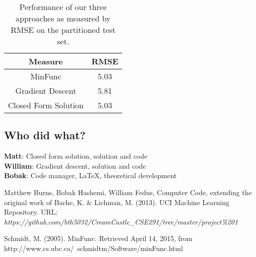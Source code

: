 \documentclass[12pt,oneside]{article}
\begin{document}
\begin{flushleft}
\begin{table}[h!]
\centering
 \begin{tabular}{| c | c|} 
 \hline
   Measure & RMSE\\ [0.7ex] 
 \hline\hline
  MinFunc & 5.03  \\ 
  \hline
  Gradient Descent & 5.81  \\  [1ex] 
 \hline
  Closed Form Solution & 5.03  \\  [1ex] 
 \hline
 \end{tabular}
 \caption{Performance of our three approaches as measured by RMSE on the partitioned test set.}
\label{tab:performance}
\end{table}

\pagebreak 


\subsection*{Who did what?}
\textbf{Matt}: Closed form solution, solution and code\\
\textbf{William}: Gradient descent, solution and code\\
\textbf{Bobak}: Code manager, LaTeX, theoretical development\\




\begin{thebibliography}{9}

  Matthew Burns, Bobak Hashemi, William Fedus, Computer Code, extending the original work of Bache, K. \& Lichman, M. (2013). UCI Machine Learning Repository. URL: \emph{https://github.com/bth5032/CreamCastle\_CSE291/tree/master/project\%201}

Schmidt, M. (2005). MinFunc. Retrieved April 14, 2015, from http://www.cs.ubc.ca/~schmidtm/Software/minFunc.html
\end{thebibliography}


\end{flushleft} 
\end{document}

